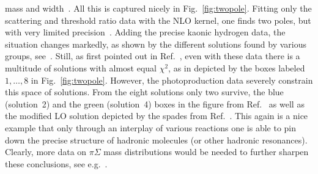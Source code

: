 mass and width~\cite{Mai:2014xna}.
All this is captured nicely in Fig.~\ref{fig:twopole}. Fitting only the
scattering and threshold ratio data with the NLO kernel, one finds two poles,
but with very limited precision~\cite{Borasoy:2006sr}.
Adding the precise kaonic hydrogen data, the situation changes markedly, as
shown by the different solutions found by various groups,
see~\cite{Ikeda:2012au,Mai:2012dt,Guo:2012vv}.
Still, as first pointed out in Ref.~\cite{Mai:2014xna}, even with these data
there is a multitude of solutions with almost equal $\chi^2$, as in depicted by
the boxes labeled $1,\ldots,8$ in Fig.~\ref{fig:twopole}.
However, the photoproduction data severely constrain this space of solutions.
From the eight solutions only two survive, the blue (solution~2) and the green
(solution~4) boxes in the figure from Ref.~\cite{Mai:2014xna} as well as the
modified LO solution depicted by the spades from Ref.~\cite{Roca:2013av}. This
again is a nice example that only through an interplay of various reactions one
is able to pin down the precise structure of hadronic molecules (or other
hadronic resonances). Clearly, more data on $\pi\Sigma$ mass distributions would
be needed to further sharpen these conclusions, see e.g.~\cite{Ohnishi:2015iaq}.





